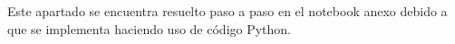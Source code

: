 Este apartado se encuentra resuelto paso a paso en el notebook anexo debido a que se implementa haciendo uso de código Python.
